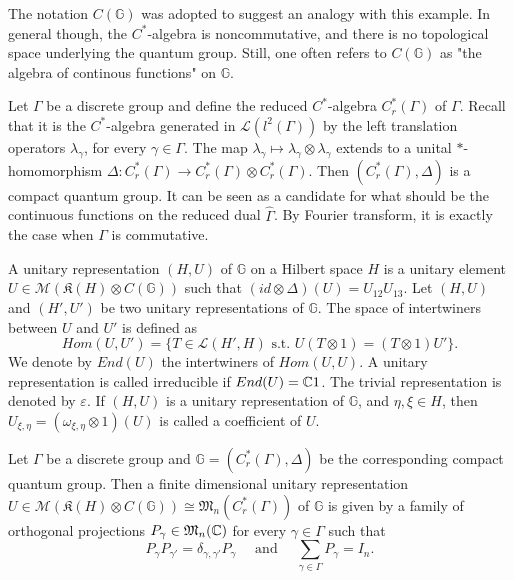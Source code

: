 The notation $C(\mathbb G)$ was adopted to suggest an analogy with this example. In general though, the $C^*$-algebra is noncommutative, and there is no topological space underlying the quantum group. Still, one often refers to $C(\mathbb G)$ as "the algebra of continous functions" on $\mathbb G$.

\begin{Expl}
Let $\Gamma$ be a discrete group and define the reduced $C^*$-algebra $C_r^*(\Gamma)$ of $\Gamma$. Recall that it is the $C^*$-algebra generated in $\mathcal L(l^2(\Gamma))$ by the left translation operators $\lambda_\gamma$, for every $\gamma\in\Gamma$. The map $ \lambda_\gamma \mapsto \lambda_\gamma\otimes \lambda_\gamma$ extends to a unital $*$-homomorphism $\Delta :C_r^*(\Gamma)\rightarrow C_r^*(\Gamma)\otimes C_r^*(\Gamma) $. Then $(C_r^*(\Gamma),\Delta)$ is a compact quantum group. It can be seen as a candidate for what should be the continuous functions on the reduced dual $\hat\Gamma$. By Fourier transform, it is exactly the case when $\Gamma$ is commutative.
\end{Expl}

\begin{definition} A unitary representation $(H,U)$ of $\mathbb G$ on a Hilbert space $H$ is a unitary element $U \in \mathcal M(\mathfrak K(H)\otimes C(\mathbb G))$ such that $(id\otimes\Delta)(U) = U_{12}U_{13}$. Let $(H,U)$ and $(H',U')$ be two unitary representations of $\mathbb G$. The space of intertwiners between $U$ and $U'$ is defined as 
\[Hom(U,U') = \{T\in \mathcal L(H',H) \text{ s.t. }U(T\otimes 1) = (T\otimes 1) U' \}.\]
We denote by $End(U)$ the intertwiners of $Hom(U,U)$. A unitary representation is called irreducible if $End(U) = \mathbb C 1$. The trivial representation is denoted by $\varepsilon$. If $(H,U)$ is a unitary representation of $\mathbb G$, and $\eta,\xi\in H$, then $U_{\xi,\eta} = (\omega_{\xi,\eta}\otimes 1)( U )$ is called a coefficient of $U$.
\end{definition}

\begin{Expl} Let $\Gamma$ be a discrete group and $\mathbb G = (C_r^*(\Gamma),\Delta)$ be the corresponding compact quantum group. Then a finite dimensional unitary representation $U\in \mathcal M(\mathfrak K(H)\otimes C(\mathbb G))\cong\mathfrak M_n(C^*_r(\Gamma))$ of $\mathbb G$ is given by a family of orthogonal projections $P_\gamma\in \mathfrak M_n(\mathbb C)$ for every $\gamma\in \Gamma$ such that 
\[P_{\gamma}P_{\gamma'} = \delta_{\gamma,\gamma'} P_{\gamma}\quad\text{ and }\quad \sum_{\gamma\in\Gamma} P_{\gamma} = I_n.\]
\end{Expl}

